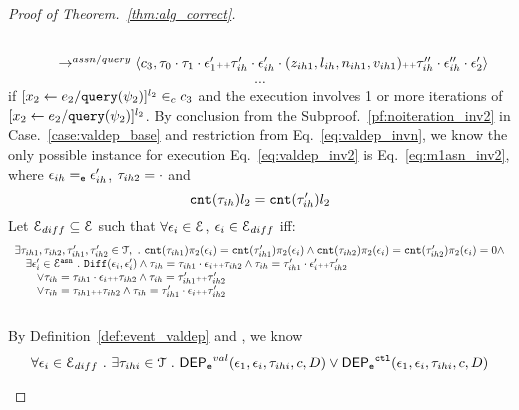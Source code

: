 \begin{proof}[Proof of Theorem.~\ref{thm:alg_correct}]
\begin{case}
\begin{subcase}
\[\begin{array}{l}
  \\ \qquad
  \rightarrow^{assn/query} 
  \langle {c}_3,  \mathtt{\tau}_0 \cdot \mathtt{\tau}_1 \cdot \mathtt{\epsilon}_1' {\scriptscriptstyle ++} \mathtt{\tau}_{ih}' \cdot \mathtt{\epsilon}_{ih}' \cdot (z_{ih1}, l_{ih}, n_{ih1}, v_{ih1}) {\scriptscriptstyle ++} \mathtt{\tau}_{ih}'' \cdot \mathtt{\epsilon}_{ih}''\cdot \mathtt{\epsilon}_2' \rangle 
\end{array}
\]
%
 \[\cdots\]
 if $[\mathrel{ {x}_2 \leftarrow e_2 / {\tt query}(\psi_2) }]^{l_2} \in_c c_3$ and the execution involves 1 or more iterations of $[\mathrel{ {x}_2 \leftarrow e_2 / {\tt query}(\psi_2) }]^{l_2}$.
 By conclusion from the Subproof.~\ref{pf:noiteration_inv2} in Case.~\ref{case:valdep_base} and restriction from Eq.~\ref{eq:valdep_invn}, 
 we know the only possible instance for execution Eq.~\ref{eq:valdep_inv2} is Eq.~\ref{eq:m1asn_inv2},
 where $\mathtt{\epsilon}_{ih} =_{\mathtt{e}} \mathtt{\epsilon}_{ih}'$, $\mathtt{\tau}_{ih2} = \cdot$ and
 \[
 \mathtt{cnt}(\mathtt{\tau}_{ih}) l_2 = \mathtt{cnt}(\mathtt{\tau}_{ih}') l_2
 \]
%
%
Let $\mathcal{E}_{diff} \subseteq \mathcal{E} $ such that $\forall \mathtt{\epsilon}_i \in \mathcal{E}$, $\mathtt{\epsilon}_i \in \mathcal{E}_{diff}$ iff:
\begin{equation}
\label{eq:valdep_ihdiff}
  \begin{array}{l}
  \exists \mathtt{\tau}_{ih1}, \mathtt{\tau}_{ih2}, \mathtt{\tau}_{ih1}', \mathtt{\tau}_{ih2}' \in \mathcal{T},
  ~.~ 
  \mathtt{cnt} (\mathtt{\tau}_{ih1} )\pi_2({\mathtt{\epsilon}_i}) = \mathtt{cnt}(\mathtt{\tau}_{ih1}') \pi_2(\mathtt{\epsilon}_i) \land
  \mathtt{cnt} (\mathtt{\tau}_{ih2} )\pi_2({\mathtt{\epsilon}_i}) = \mathtt{cnt}(\mathtt{\tau}_{ih2}') \pi_2(\mathtt{\epsilon}_i) = 0
  \land
  \\ \quad \exists \mathtt{\epsilon}_i' \in \mathcal{E}^{\mathtt{{asn}}}  ~.~
  \mathtt{Diff}(\mathtt{\epsilon}_i, \mathtt{\epsilon}_i') \land 
  \mathtt{\tau}_{ih} = \mathtt{\tau}_{ih1} \cdot \mathtt{\epsilon}_i {\scriptscriptstyle ++} \mathtt{\tau}_{ih2} 
  \land 
  \mathtt{\tau}_{ih} = \mathtt{\tau}_{ih1}' \cdot \mathtt{\epsilon}_i' {\scriptscriptstyle ++} \mathtt{\tau}_{ih2}'
  \\ \qquad \lor 
  \mathtt{\tau}_{ih} = \mathtt{\tau}_{ih1} \cdot \mathtt{\epsilon}_i {\scriptscriptstyle ++} \mathtt{\tau}_{ih2} 
  \land 
  \mathtt{\tau}_{ih} = \mathtt{\tau}_{ih1}' {\scriptscriptstyle ++} \mathtt{\tau}_{ih2}'
  \\ \qquad \lor 
  \mathtt{\tau}_{ih} = \mathtt{\tau}_{ih1} {\scriptscriptstyle ++} \mathtt{\tau}_{ih2} 
  \land 
  \mathtt{\tau}_{ih} = \mathtt{\tau}_{ih1}' \cdot \mathtt{\epsilon}_i {\scriptscriptstyle ++} \mathtt{\tau}_{ih2}'
  \end{array}
\end{equation}
%
\\
By Definition~\ref{def:event_valdep} and , we know
\[
  \forall \mathtt{\epsilon}_i \in \mathcal{E}_{diff} ~.~ \exists \mathtt{\tau}_{ihi} \in \mathcal{T} ~.~
  \mathsf{DEP_{\mathtt{e}}}^{val}(\mathtt{\epsilon}_1, \mathtt{\epsilon}_i, \mathtt{\tau}_{ihi}, c, D) 
  \lor \mathsf{DEP_{\mathtt{e}}}^{\mathtt{{ctl}}}(\mathtt{\epsilon}_1, \mathtt{\epsilon}_i, \mathtt{\tau}_{ihi}, c, D)
\]
\end{subcase}
\end{case}
\end{proof}
